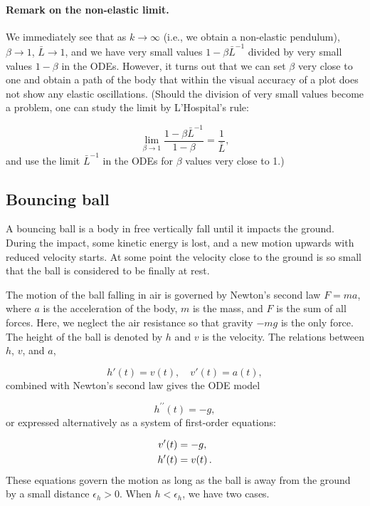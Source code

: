 \documentclass[%
oneside,                 %
final,                   %
10pt]{article}
\begin{document}
\paragraph{Remark on the non-elastic limit.}
We immediately see that as $k\rightarrow\infty$ (i.e., we obtain a non-elastic
pendulum), $\beta\rightarrow 1$, $\bar L\rightarrow 1$, and we have
very small values $1-\beta\bar L^{-1}$ divided by very small values
$1-\beta$ in the ODEs. However, it turns out that we can set $\beta$
very close to one and obtain a path of the body that within the visual
accuracy of a plot does not show any elastic oscillations.
(Should the division of very small values become a problem, one can
study the limit by L'Hospital's rule:

\[ \lim_{\beta\rightarrow 1}\frac{1 - \beta \bar L^{-1}}{1-\beta}
= \frac{1}{\bar L},\]
and use the limit $\bar L^{-1}$ in the ODEs for $\beta$ values very
close to 1.)


\subsection{Bouncing ball}
\label{vib:app:bouncing_ball}

A bouncing ball is a body in free vertically fall until it impacts the
ground. During the impact, some kinetic energy is lost, and a new
motion upwards with reduced velocity starts.  At some point the
velocity close to the ground is so small that the ball is considered
to be finally at rest.

The motion of the ball falling in air is governed by Newton's second
law $F=ma$, where $a$ is the acceleration of the body, $m$ is the mass,
and $F$ is the sum of all forces. Here, we neglect the air resistance
so that gravity $-mg$ is the only force. The height of the ball is
denoted by $h$ and $v$ is the velocity. The relations between $h$, $v$, and
$a$,

\[ h'(t)= v(t),\quad v'(t) = a(t),\]
combined with Newton's second law gives the ODE model

\begin{equation}
h^{\prime\prime}(t) = -g,
\label{vib:app:bouncing:ball:h2eq}
\end{equation}
or expressed alternatively as a system of first-order equations:

\begin{align}
v'(t) &= -g,
\label{vib:app:bouncing:ball:veq} \\ 
h'(t) &= v(t)\tp
\label{vib:app:bouncing:ball:heq}
\end{align}
These equations govern the motion as long as the ball is away from
the ground by a small distance $\epsilon_h > 0$. When $h<\epsilon_h$,
we have two cases.
\end{document}
